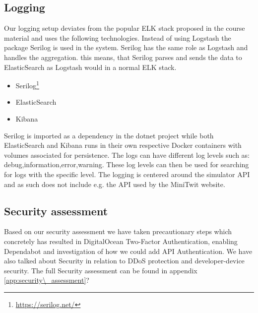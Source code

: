 \subsection{Logging}
Our logging setup deviates from the popular ELK stack proposed in the course material and uses the following technologies. Instead of using Logstash the package Serilog is used in the system. Serilog has the same role as Logstash and handles the aggregation. this means, that Serilog parses and sends the data to ElasticSearch as Logstash would in a normal ELK stack.
\begin{itemize}
    \item Serilog\footnote{\url{https://serilog.net/}}
    \item ElasticSearch
    \item Kibana 
\end{itemize}
Serilog is imported as a dependency in the dotnet project while both ElasticSearch and Kibana runs in their own respective Docker containers with volumes associated for persistence. The logs can have different log levels such as: debug,information,error,warning. These log levels can then be used for searching for logs with the specific level.
The logging is centered around the simulator API and as such does not include e.g. the API used by the MiniTwit website.\\ 





\subsection{Security assessment}
Based on our security assessment we have taken precautionary steps which concretely has resulted in DigitalOcean Two-Factor Authentication, enabling Dependabot and investigation of how we could add API Authentication. We have also talked about Security in relation to DDoS protection and developer-device security. The full Security assessment can be found in appendix \ref{app:security\_assessment}?

